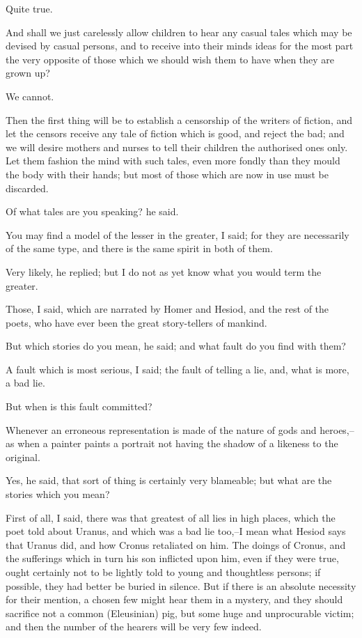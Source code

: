 Quite true.

And shall we just carelessly allow children to hear any casual tales
which may be devised by casual persons, and to receive into their minds
ideas for the most part the very opposite of those which we should wish
them to have when they are grown up?

We cannot.

Then the first thing will be to establish a censorship of the writers of
fiction, and let the censors receive any tale of fiction which is good,
and reject the bad; and we will desire mothers and nurses to tell their
children the authorised ones only. Let them fashion the mind with such
tales, even more fondly than they mould the body with their hands; but
most of those which are now in use must be discarded.

Of what tales are you speaking? he said.

You may find a model of the lesser in the greater, I said; for they are
necessarily of the same type, and there is the same spirit in both of
them.

Very likely, he replied; but I do not as yet know what you would term
the greater.

Those, I said, which are narrated by Homer and Hesiod, and the rest of
the poets, who have ever been the great story-tellers of mankind.

But which stories do you mean, he said; and what fault do you find with
them?

A fault which is most serious, I said; the fault of telling a lie, and,
what is more, a bad lie.

But when is this fault committed?

Whenever an erroneous representation is made of the nature of gods and
heroes,--as when a painter paints a portrait not having the shadow of a
likeness to the original.

Yes, he said, that sort of thing is certainly very blameable; but what
are the stories which you mean?

First of all, I said, there was that greatest of all lies in high
places, which the poet told about Uranus, and which was a bad lie
too,--I mean what Hesiod says that Uranus did, and how Cronus retaliated
on him. The doings of Cronus, and the sufferings which in turn his son
inflicted upon him, even if they were true, ought certainly not to be
lightly told to young and thoughtless persons; if possible, they had
better be buried in silence. But if there is an absolute necessity
for their mention, a chosen few might hear them in a mystery, and
they should sacrifice not a common (Eleusinian) pig, but some huge and
unprocurable victim; and then the number of the hearers will be very few
indeed.

